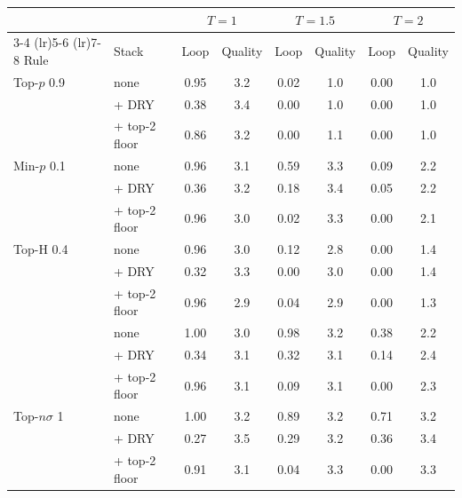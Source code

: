 \begin{tabular}{llcccccc}
\toprule
 & & \multicolumn{2}{c}{$T{=}1$} & \multicolumn{2}{c}{$T{=}1.5$} & \multicolumn{2}{c}{$T{=}2$} \\
\cmidrule(lr){3-4} \cmidrule(lr){5-6} \cmidrule(lr){7-8}
Rule & Stack & Loop & Quality & Loop & Quality & Loop & Quality \\
\midrule
Top-$p$ 0.9 & none & 0.95 & 3.2 & 0.02 & 1.0 & 0.00 & 1.0 \\
 & + DRY & 0.38 & 3.4 & 0.00 & 1.0 & 0.00 & 1.0 \\
 & + top-2 floor & 0.86 & 3.2 & 0.00 & 1.1 & 0.00 & 1.0 \\
\addlinespace[2pt]
Min-$p$ 0.1 & none & 0.96 & 3.1 & 0.59 & 3.3 & 0.09 & 2.2 \\
 & + DRY & 0.36 & 3.2 & 0.18 & 3.4 & 0.05 & 2.2 \\
 & + top-2 floor & 0.96 & 3.0 & 0.02 & 3.3 & 0.00 & 2.1 \\
\addlinespace[2pt]
Top-H 0.4 & none & 0.96 & 3.0 & 0.12 & 2.8 & 0.00 & 1.4 \\
 & + DRY & 0.32 & 3.3 & 0.00 & 3.0 & 0.00 & 1.4 \\
 & + top-2 floor & 0.96 & 2.9 & 0.04 & 2.9 & 0.00 & 1.3 \\
\addlinespace[2pt]
\pless{} & none & 1.00 & 3.0 & 0.98 & 3.2 & 0.38 & 2.2 \\
 & + DRY & 0.34 & 3.1 & 0.32 & 3.1 & 0.14 & 2.4 \\
 & + top-2 floor & 0.96 & 3.1 & 0.09 & 3.1 & 0.00 & 2.3 \\
\addlinespace[2pt]
Top-$n\sigma$ 1 & none & 1.00 & 3.2 & 0.89 & 3.2 & 0.71 & 3.2 \\
 & + DRY & 0.27 & 3.5 & 0.29 & 3.2 & 0.36 & 3.4 \\
 & + top-2 floor & 0.91 & 3.1 & 0.04 & 3.3 & 0.00 & 3.3 \\
\bottomrule
\end{tabular}

